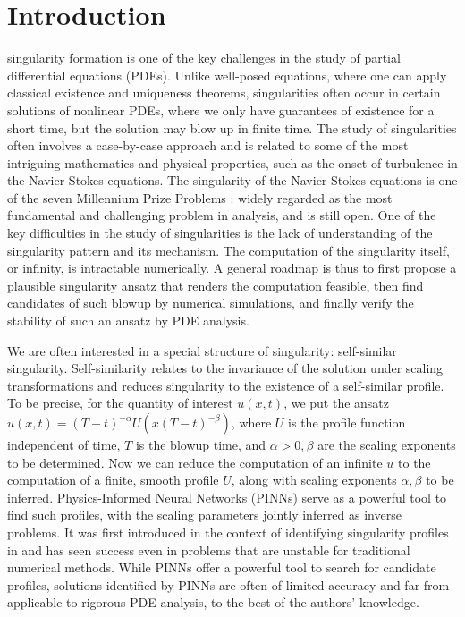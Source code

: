 \documentclass[12pt]{caltech_thesis}
\numberwithin{equation}{section}
\begin{document}
  \section{Introduction}
singularity formation is one of the key challenges in the study of partial differential equations (PDEs).
Unlike well-posed equations, where one can apply classical existence and uniqueness theorems,
singularities often occur in certain solutions of nonlinear PDEs, where we only have guarantees 
of existence for a short time, but the solution may blow up in finite time.
The study of singularities often involves a case-by-case approach and is related to 
some of the most intriguing mathematics and physical properties, such as the onset of turbulence in the Navier-Stokes equations.
The singularity of the Navier-Stokes equations is one of the seven Millennium Prize Problems \cite{fefferman2006existence}:
widely regarded as the most fundamental and challenging problem in analysis, and is still open.
One of the key difficulties in the study of singularities is the lack of 
understanding of the singularity pattern and its mechanism. The computation of the 
singularity itself, or infinity, is intractable numerically.
A general roadmap is thus to first propose a plausible singularity ansatz that renders
the computation feasible,
then find candidates of such blowup by numerical simulations, and
finally verify the stability of such an ansatz by PDE analysis.

We are often interested in a special structure of singularity: self-similar singularity.
Self-similarity relates to the invariance of the solution under scaling transformations 
and reduces singularity to the existence of a self-similar profile. To be precise, for the quantity of interest $u(x,t)$,
we put the ansatz $u(x,t) = (T-t)^{-\alpha} U(x(T-t)^{-\beta})$, where $U$ is the profile function
independent of time, $T$ is the blowup time, and $\alpha>0, \beta$ are the scaling exponents to be determined.
Now we can reduce the computation of an infinite $u$ to the computation of a finite, smooth profile $U$, 
along with scaling exponents $\alpha, \beta$ to be inferred. Physics-Informed Neural Networks (PINNs) \cite{raissi2019physics}
serve as a powerful tool to find such profiles, with the scaling parameters jointly inferred as inverse problems. It was first introduced in the context of identifying singularity profiles in \cite{wang2023asymptotic} and has seen success 
even in problems that are unstable for traditional numerical methods. While PINNs offer a powerful tool to search
for candidate profiles, solutions identified by PINNs are often of limited accuracy and far from applicable to
rigorous PDE analysis, to the best of the authors' knowledge.
\end{document}

